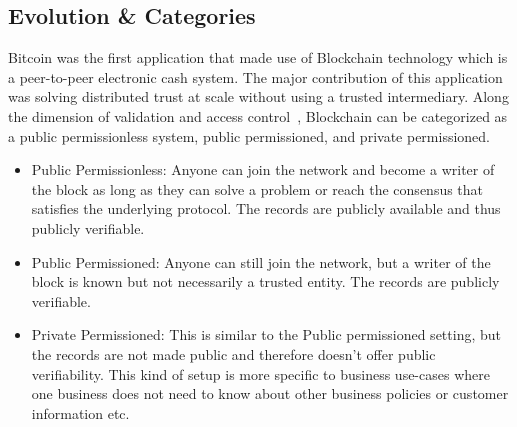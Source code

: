 \subsection{Evolution \& Categories}
Bitcoin was the first application that made use of Blockchain technology which
is a peer-to-peer electronic cash system. The major contribution of this
application was solving distributed trust at scale without using a trusted
intermediary. 
Along the dimension of validation and access control~\cite{voronchenko2017you},
Blockchain can be categorized as a public permissionless system, public
permissioned, and private permissioned. 
\begin{itemize}
	\item Public Permissionless: Anyone can join the network and become a writer
		of the block as long as they can solve a problem or reach the consensus
		that satisfies the underlying protocol. The records are publicly
		available and thus publicly verifiable. 
	\item Public Permissioned: Anyone can still join the network, but a writer
		of the block is known but not necessarily a trusted entity. The records
		are publicly verifiable. 
	\item Private Permissioned: This is similar to the Public permissioned
		setting, but the records are not made public and therefore doesn't
		offer public verifiability. This kind of setup is more specific to
		business use-cases where one business does not need to know about other
		business policies or customer information etc. 
\end{itemize}


